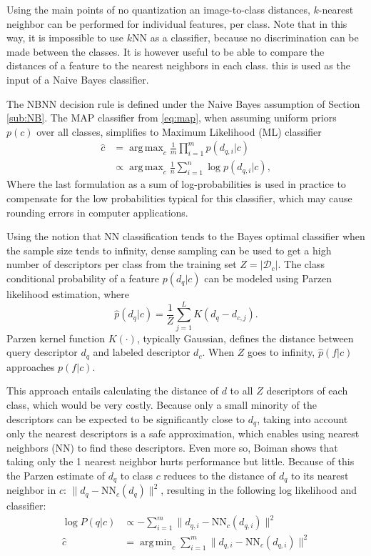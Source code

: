 \documentclass[a4paper,10pt]{article}
\DeclareMathOperator*{\argmax}{arg\,max}
\DeclareMathOperator*{\argmin}{arg\,min}
\begin{document}
Using the main points of no quantization an image-to-class distances, $k$-nearest neighbor can be performed for individual features, per class. Note that in this way, it is impossible to use $k$NN as a classifier, because no discrimination can be made between the classes. It is however useful to be able to compare the distances of a feature to the nearest neighbors in each class. this is used as the input of a Naive Bayes classifier.


The NBNN decision rule is defined under the Naive Bayes assumption of Section \ref{sub:NB}. The MAP classifier from \eqref{eq:map}, when assuming uniform priors $p(c)$ over all classes, simplifies to Maximum Likelihood (ML) classifier 
\begin{align}
    \hat c &= \argmax_c \frac{1}{m}\prod_{i=1}^{m} p(d_{q,i}|c)\\
           &\propto \argmax_c \frac{1}{n}\sum_{i=1}^{n} \log p(d_{q,i}|c),
\end{align}
Where the last formulation as a sum of log-probabilities is used in practice to compensate for the low probabilities typical for this classifier, which may cause rounding errors in computer applications.

Using the notion that NN classification tends to the Bayes optimal classifier when the sample size tends to infinity\cite{cover1967nearest, boiman2008defense}, dense sampling can be used to get a high number of descriptors per class from the training set $Z = |\mathcal{D}_c|$. The class conditional probability of a feature $p(d_q|c)$ can be modeled using Parzen likelihood estimation, where
\begin{equation} \label{eq:parzen}
    \hat p(d_q|c) = \frac{1}{Z}\sum_{j=1}^L K(d_q-d_{c,j}).
\end{equation}
Parzen kernel function $K(\cdot)$, typically Gaussian, defines the distance between query descriptor $d_{q}$ and labeled descriptor $d_{c}$. When $Z$ goes to infinity, $\hat p(f|c)$ approaches $p(f|c)$. 

This approach entails calculating the distance of $d$ to all $Z$ descriptors of each class, which would be very costly. Because only a small minority of the descriptors can be expected to be significantly close to $d_q$, taking into account only the nearest descriptors is a safe approximation, which enables using nearest neighbors (NN) to find these descriptors. Even more so, Boiman shows that taking only the 1 nearest neighbor hurts performance but little. Because of this the Parzen estimate of $d_q$ to class $c$ reduces to the distance of $d_q$ to its nearest neighbor in $c$: $\|d_q - \text{NN}_c(d_q)\|^2$, resulting in the following log likelihood and classifier: 
\begin{align}
    \label{eq:nbnnloglikelihood}
    \log P(q|c) &\propto -\sum_{i=1}^m \|d_{q,i} - \text{NN}_c(d_{q,i})\|^2 \\
    \label{eq:nbnnclass}
    \hat c      &= \argmin_c \sum_{i=1}^m \|d_{q,i} - \text{NN}_c(d_{q,i})\|^2
\end{align}
\end{document}
